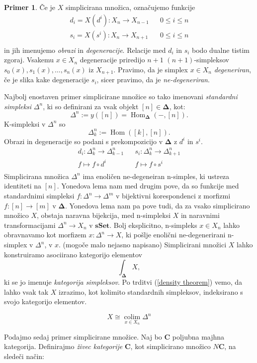 \documentclass[12pt,a4paper]{book}
\theoremstyle{definition}
\theoremstyle{plain}
\theoremstyle{definition}
\newtheorem{primer}{Primer}[section]
\theoremstyle{remark}
\newcommand{\cat}[1]{\textbf{#1}}
\DeclareMathOperator{\Hom}{Hom}
\DeclareMathOperator{\colim}{colim}
\begin{document}
\begin{primer}
Če je $X$ simplicirana množica, označujemo funkcije
\begin{align*}
d_i = X(d^i) : X_n \to X_{n-1} & & 0 \leq i \leq n \\
s_i = X(s^i) : X_n \to X_{n+1} & & 0 \leq i \leq n \\
\end{align*}
in jih imenujemo \emph{obrazi} in \emph{degeneracije}. Relacije med $d_i$ in $s_i$ bodo dualne tistim zgoraj.
Vsakemu $x \in X_n$ degeneracije priredijo $n+1$ $(n+1)$-simpleksov $s_0(x), s_1(x), \ldots , s_n(x)$ iz  $X_{n+1}$. Pravimo, da je simplex $x \in X_n$ \emph{degeneriran}, če je slika kake degeneracije $s_i$, sicer pravimo, da je \emph{ne-degeneriran}.


Najbolj enostaven primer simplicirane množice so tako imenovani \emph{standardni simpleksi} $\Delta^n$, ki so definirani za vsak objekt $[n] \in \mathbf{\Delta}$, kot:
$$\Delta^n := y([n]) = \Hom_{\mathbf{\Delta}}(-,[n]).$$
K-simpleksi v $\Delta^n$ so 
$$\Delta_k^n := \Hom([k], [n]).$$
Obrazi in degeneracije so podani s prekompozicijo v $\mathbf{\Delta}$ z $d^i$ in $s^i$.
\begin{align*}
d_i : \Delta_k^n \to \Delta_{k-1}^n & & s_i : \Delta_k^n \to \Delta_{k+1}^n \\
f \mapsto f \circ d^i & & f \mapsto f \circ s^i \\
\end{align*}
Simplicirana množica $\Delta^n$ ima enoličen ne-degeneiran n-simples, ki ustreza identiteti na $[n]$. Yonedova lema nam med drugim pove, da so funkcije med standardnimi simpleksi $f : \Delta^n \to \Delta^m$ v bijektivni korespondenci z morfizmi $f : [n] \to [m]$ v $\mathbf{\Delta}$. Yonedova lema nam pa pove tudi, da za vsako simplicirano množico $X$, obstaja naravna bijekcija, med n-simpleksi $X$ in naravnimi transformacijami $\Delta^n \to X_n$ v $\cat{sSet}$. Bolj eksplicitno, n-simpleks $x \in X_n$ lahko obravnavamo kot morfizem $x : \Delta^n \to X$, ki pošlje enolični ne-degenerirani n-simplex v $\Delta^n$, v $x$. (mogoče malo nejasno napisano)
Simplicirani množici $X$ lahko konstruiramo asociirano kategorijo elementov
$$\int_{\mathbf{\Delta}}X,$$
ki se jo imenuje \emph{kategorija simpleksov}. Po trditvi (\ref{density theorem}) vemo, da lahko vsak tak $X$ izrazimo, kot kolimito standardnih simpleksov, indeksirano s svojo kategorijo elementov.

$$X \cong \underset{x \in X_n}{\colim}\Delta^n$$


Podajmo sedaj primer simplicirane množice. Naj bo $\cat{C}$ poljubna majhna kategorija. Definirajmo \emph{živec kategorije} $\cat{C}$, kot simplicirano množico $N\cat{C}$, na sledeči način:


\end{primer}
\end{document}
